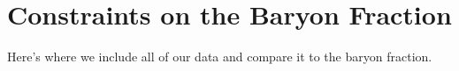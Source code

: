 \chapter{Constraints on the Baryon Fraction}
\label{c.Constraints}
Here's where we include all of our data and compare it to the baryon
fraction.
